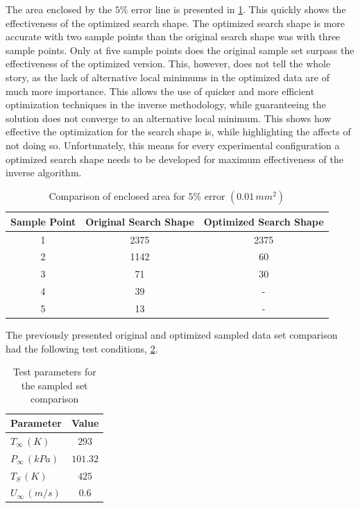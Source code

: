\documentclass[preprint,12pt]{elsarticle}
\begin{document}
The area enclosed by the $5\%$ error line is presented in \cref{tab:area}.  This quickly shows the effectiveness of the optimized search shape.  The optimized search shape is more accurate with two sample points than the original search shape was with three sample points.  Only at five sample points does the original sample set surpass the effectiveness of the optimized version.  This, however, does not tell the whole story, as the lack of alternative local minimums in the optimized data are of much more importance.  This allows the use of quicker and more efficient optimization techniques in the inverse methodology, while guaranteeing the solution does not converge to an alternative local minimum.  This shows how effective the optimization for the search shape is, while highlighting the affects of not doing so.  Unfortunately, this means for every experimental configuration a optimized search shape needs to be developed for maximum effectiveness of the inverse algorithm.
%
\begin{table}[!h!t!b!p]
\begin{center}
\begin{tabular}{ c c c }
\hline
 Sample Point & Original Search Shape & Optimized Search Shape  \\ \hline 
1 & 2375 & 2375 \\
2 & 1142 & 60 \\
3 & 71 & 30 \\
4 & 39 & -   \\
5 & 13 & -   \\ \hline
 \end{tabular}
\caption{Comparison of enclosed area for $5\%$ error $(0.01\,mm^2)$}
\label{tab:area}
\end{center}
\end{table}

The previously presented original and optimized sampled data set comparison had the following test conditions, \cref{tab:sampleset}.
%
\begin{table}[!h!t!b!p]
\begin{center}
\begin{tabular}{ l c}
\hline
Parameter & Value \\ \hline
$T_{\infty}\, (K)$ & $293$ \\
$P_{\infty}\, (kPa)$ & $101.32$ \\
$T_{S}\, (K)$ & $425$ \\
$U_{\infty} \, (m/s)$ & $0.6$ \\ \hline
 \end{tabular}
 \end{center}
\caption{Test parameters for the sampled set comparison}
\label{tab:sampleset}
\end{table}
\end{document}
